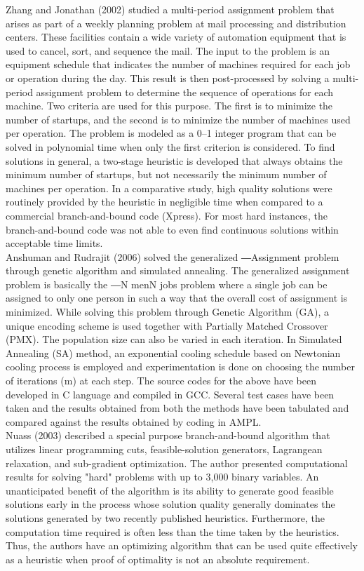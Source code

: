 \documentclass[11pt]{report}
\newcommand{\NI}{\noindent}
\begin{document}
	\NI Zhang and Jonathan (2002) studied a multi-period assignment problem that arises as part of a weekly planning problem at mail processing and distribution centers. These facilities contain a wide variety of automation equipment that is used to cancel, sort, and sequence the mail. The input
	to the problem is an equipment schedule that indicates the number of machines required for each job or operation during the day. This result is then post-processed by solving a multi-period assignment problem to determine the sequence of operations for each machine. Two criteria are
	used for this purpose. The first is to minimize the number of startups, and the second is to minimize the number of machines used per operation. The problem is modeled as a 0–1 integer program that can be solved in polynomial time when only the first criterion is considered. To find solutions in
	general, a two-stage heuristic is developed that always obtains the minimum number of startups, but not necessarily the minimum number of machines per operation. In a comparative study, high quality solutions were routinely provided by the heuristic in negligible time when compared to a commercial branch-and-bound code (Xpress). For most hard instances, the branch-and-bound code was not able to even find continuous solutions within acceptable time limits.\\
	
	\NI Anshuman and Rudrajit (2006) solved the generalized ―Assignment problem through genetic algorithm and simulated annealing. The generalized assignment problem is basically the ―N menN jobs problem where a single job can be assigned to only one person in such a way that the overall cost of assignment is minimized. While solving this problem through Genetic Algorithm (GA), a unique encoding scheme is used together with Partially Matched Crossover (PMX). The
	population size can also be varied in each iteration. In Simulated Annealing (SA) method, an exponential cooling schedule based on Newtonian cooling process is employed and
	experimentation is done on choosing the number of iterations (m) at each step. The source codes for the above have been developed in C language and compiled in GCC. Several test cases have been taken and the results obtained from both the methods have been tabulated and compared against the results obtained by coding in AMPL.\\
	
	\NI Nuass (2003) described a special purpose branch-and-bound algorithm that utilizes linear programming cuts, feasible-solution generators, Lagrangean relaxation, and sub-gradient optimization. The author presented computational results for solving "hard" problems with up to 3,000 binary variables. An unanticipated benefit of the algorithm is its ability to generate good feasible solutions early in the process whose solution quality generally dominates the solutions generated by two recently published heuristics. Furthermore, the computation time required is often less than the time taken by the heuristics. Thus, the authors have an optimizing algorithm that can be used quite effectively as a heuristic when proof of optimality is not an absolute
	requirement.\\
	
\end{document}
